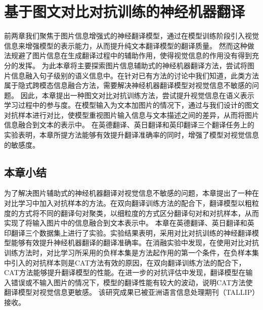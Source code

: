 \chapter{基于图文对比对抗训练的神经机器翻译}
前两章我们聚焦于图片信息增强式的神经翻译模型，通过在模型训练阶段引入视觉信息来增强模型的表示能力，从而提升纯文本翻译模型的翻译质量。
然而这种做法规避了图片信息在生成翻译过程中的辅助作用，使得视觉信息的作用没有得到充分的发挥。
为此本章将主要探索图片信息辅助式的神经机器翻译方法，尝试将图片信息融入句子级别的语义信息中。在针对已有方法的讨论中我们知道，此类方法属于隐式跨模态信息融合方法，需要解决神经机器翻译模型对视觉信息不敏感的问题。
因此，本章提出一种图文对比对抗训练方法，尝试提升视觉信息在语义表示学习过程中的参与度。在模型输入为文本加图片的情况下，通过与我们设计的图文对抗样本进行对比，使模型重视图片输入信息与文本描述之间的差异，从而将图片信息融合到文本的表示中。
在英德翻译、英日翻译和英印翻译三个翻译任务上的实验表明，本章所提方法能够有效提升翻译准确率的同时，增强了模型对视觉信息的敏感度。







\section{本章小结}
为了解决图片辅助式的神经机器翻译对视觉信息不敏感的问题，本章提出了一种在对比学习中加入对抗样本的方法。在双向翻译训练方法的配合下，翻译模型以粗粒度的方式将不同的翻译句对聚类，以细粒度的方式区分翻译句对和对抗样本，从而实现了将输入图片中的信息融合到文本表示中。
本章在英德翻译、英日翻译和英印翻译三个数据集上进行了实验。实验结果表明，采用对比对抗训练的神经翻译模型能够有效提升神经机器翻译的翻译准确率。在消融实验中发现，在使用对比对抗训练方法时，对比学习所采用的负样本集是方法起作用的第一个条件，在负样本集中引入的对抗样本则是CAT方法有效的原因，在双向翻译训练方法的配合下，CAT方法能够提升翻译模型的性能。在进一步的对抗评估中发现，翻译模型在输入错误或不输入图片的情况下，模型的翻译性能有较大的波动，说明CAT方法使翻译模型对视觉信息更敏感。
该研究成果已被亚洲语言信息处理期刊（TALLIP）接收。